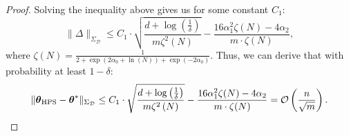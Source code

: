 \begin{proof}
Solving the inequality above gives us for some constant $C_{1}$:
\begin{equation*}
\|\Delta\|_{\Sigma_{\mathcal{D}}}\leq C_{1}\cdot\sqrt{\frac{d+\log\left(\frac{1}{\delta}\right)}{m\zeta^{2}\left(N\right)}}-\frac{16\alpha_{1}^{2}\zeta(N)-4\alpha_{2}}{m\cdot\zeta(N)},
\end{equation*}
where $\zeta\left(N\right)=\frac{1}{2+\exp\left(2\alpha_{0}+\ln(N)\right)+\exp\left(-2\alpha_{0}\right)}$.
Thus, we can derive that with probability at least $1-\delta$:
\begin{equation*}
\|{\boldsymbol{\theta}}_{\text{HPS}}-{\boldsymbol{\theta}}^{*}\|_{{\Sigma}_{\mathcal{D}}}\leq C_{1}\cdot\sqrt{\frac{d+\log\left(\frac{1}{\delta}\right)}{m\zeta^{2}\left(N\right)}}-\frac{16\alpha_{1}^{2}\zeta(N)-4\alpha_{2}}{m\cdot\zeta(N)}=\mathcal{O}\left(\frac{n}{\sqrt{m}}\right).
\end{equation*}


\end{proof}
